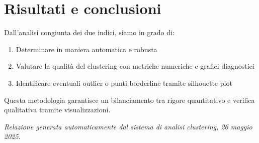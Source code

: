 \documentclass[a4paper,12pt]{article}
\begin{document}
\section{Risultati e conclusioni}
Dall'analisi congiunta dei due indici, siamo in grado di:
\begin{enumerate}
\item Determinare  in maniera automatica e robusta
\item Valutare la qualità del clustering con metriche numeriche e grafici diagnostici
\item Identificare eventuali outlier o punti borderline tramite silhouette plot
\end{enumerate}
Questa metodologia garantisce un bilanciamento tra rigore quantitativo e verifica qualitativa tramite visualizzazioni.

\vfill
\noindent\textit{Relazione generata automaticamente dal sistema di analisi clustering, 26 maggio 2025.}
\end{document}
